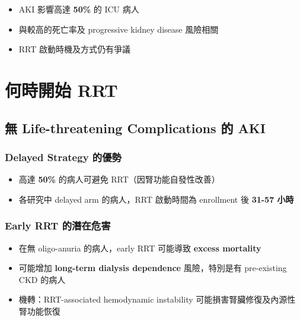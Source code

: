 \documentclass[12pt,a4paper]{article}
\begin{document}
\begin{itemize}
    \item AKI 影響高達 \textbf{50\%} 的 ICU 病人
    \item 與較高的死亡率及 progressive kidney disease 風險相關
    \item RRT 啟動時機及方式仍有爭議
\end{itemize}

\section{何時開始 RRT}

\subsection{無 Life-threatening Complications 的 AKI}


\subsubsection{Delayed Strategy 的優勢}

\begin{itemize}
    \item 高達 \textbf{50\%} 的病人可避免 RRT（因腎功能自發性改善）
    \item 各研究中 delayed arm 的病人，RRT 啟動時間為 enrollment 後 \textbf{31-57 小時}
\end{itemize}

\subsubsection{Early RRT 的潛在危害}

\begin{itemize}
    \item 在無 oligo-anuria 的病人，early RRT 可能導致 \textbf{excess mortality}
    \item 可能增加 \textbf{long-term dialysis dependence} 風險，特別是有 pre-existing CKD 的病人
    \item 機轉：RRT-associated hemodynamic instability 可能損害腎臟修復及內源性腎功能恢復
\end{itemize}
\end{document}
